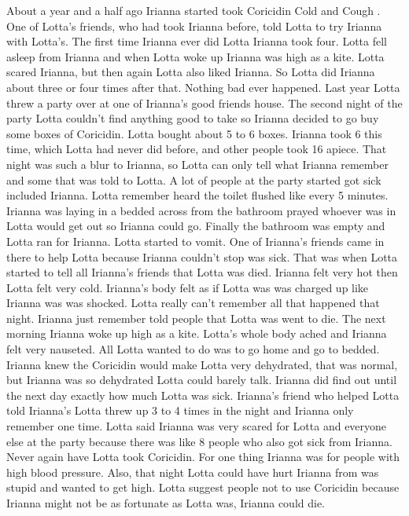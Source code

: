 \documentclass[12pt]{book}
\begin{document}
About a year and a half ago Irianna started took Coricidin Cold and Cough . One of Lotta's friends, who had took Irianna before, told Lotta to try Irianna with Lotta's. The first time Irianna ever did Lotta Irianna took four. Lotta fell asleep from Irianna and when Lotta woke up Irianna was high as a kite. Lotta scared Irianna, but then again Lotta also liked Irianna. So Lotta did Irianna about three or four times after that. Nothing bad ever happened. Last year Lotta threw a party over at one of Irianna's good friends house. The second night of the party Lotta couldn't find anything good to take so Irianna decided to go buy some boxes of Coricidin. Lotta bought about 5 to 6 boxes. Irianna took 6 this time, which Lotta had never did before, and other people took 16 apiece. That night was such a blur to Irianna, so Lotta can only tell what Irianna remember and some that was told to Lotta. A lot of people at the party started got sick included Irianna. Lotta remember heard the toilet flushed like every 5 minutes. Irianna was laying in a bedded across from the bathroom prayed whoever was in Lotta would get out so Irianna could go. Finally the bathroom was empty and Lotta ran for Irianna. Lotta started to vomit. One of Irianna's friends came in there to help Lotta because Irianna couldn't stop was sick. That was when Lotta started to tell all Irianna's friends that Lotta was died. Irianna felt very hot then Lotta felt very cold. Irianna's body felt as if Lotta was was charged up like Irianna was was shocked. Lotta really can't remember all that happened that night. Irianna just remember told people that Lotta was went to die. The next morning Irianna woke up high as a kite. Lotta's whole body ached and Irianna felt very nauseted. All Lotta wanted to do was to go home and go to bedded. Irianna knew the Coricidin would make Lotta very dehydrated, that was normal, but Irianna was so dehydrated Lotta could barely talk. Irianna did find out until the next day exactly how much Lotta was sick. Irianna's friend who helped Lotta told Irianna's Lotta threw up 3 to 4 times in the night and Irianna only remember one time. Lotta said Irianna was very scared for Lotta and everyone else at the party because there was like 8 people who also got sick from Irianna. Never again have Lotta took Coricidin. For one thing Irianna was for people with high blood pressure. Also, that night Lotta could have hurt Irianna from was stupid and wanted to get high. Lotta suggest people not to use Coricidin because Irianna might not be as fortunate as Lotta was, Irianna could die.
\end{document}
